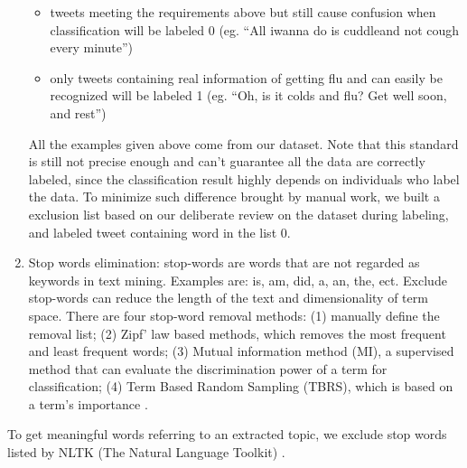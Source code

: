 \begin{enumerate}
\begin{itemize}
        \item tweets meeting the requirements above but still cause confusion when classification will be labeled 0 (eg. ``All iwanna do is cuddleand not cough every minute'')
        \item only tweets containing real information of getting flu and can easily be recognized will be labeled 1 (eg. ``Oh, is it colds and flu? Get well soon, and rest'')
    \end{itemize} 
    All the examples given above come from our dataset. Note that this standard is still not precise enough and can't guarantee all the data are correctly labeled, since the classification result highly depends on individuals who label the data. To minimize such difference brought by manual work, we built a exclusion list based on our deliberate review on the dataset during labeling, and labeled tweet containing word in the list 0.
    \item Stop words elimination: stop-words are words that are not regarded as keywords in text mining. Examples are: is, am, did, a, an, the, ect. Exclude stop-words can reduce the length of the text and dimensionality of term space\cite{vijayarani2015preprocessing}. There are four stop-word removal methods: (1) manually define the removal list; (2) Zipf' law based methods, which removes the most frequent and least frequent words; (3) Mutual information method (MI), a supervised method that can evaluate the discrimination power of a term for classification; (4) Term Based Random Sampling (TBRS), which is based on a term's importance \cite{jivani2011comparative}. 
\end{enumerate}

To get meaningful words referring to an extracted topic, we exclude stop words listed by NLTK (The Natural Language Toolkit) \cite{journals/corr/cs-CL-0205028}.

